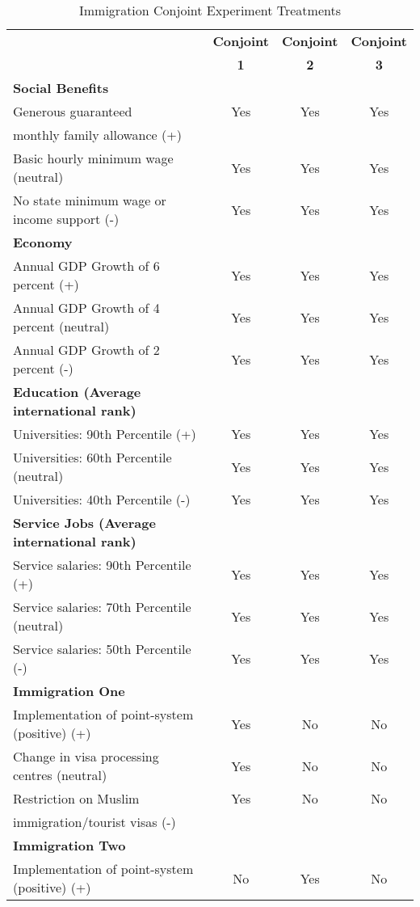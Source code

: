 \documentclass[12pt]{article}
\begin{document}
\begin{table}[!ht]
\caption{Immigration Conjoint Experiment Treatments}\label{tab:attributes}
\begin{center}
\begin{tabular}{lccc}\footnotesize
&\bf Conjoint& \bf Conjoint& \bf Conjoint\\
&\bf  1 & \bf  2 & \bf  3 \\
\hline\hline
\bf Social Benefits &  & & \\
Generous guaranteed& Yes & Yes & Yes \\
monthly family allowance (+)&  &  &  \\
Basic hourly minimum wage (neutral)& Yes & Yes  & Yes \\
No state minimum wage or income support (-)& Yes & Yes & Yes  \\
\hline\hline
\bf Economy  &  & & \\
Annual GDP Growth of 6 percent (+)& Yes & Yes & Yes \\
Annual GDP Growth of 4 percent (neutral)& Yes & Yes  & Yes \\
Annual GDP Growth of 2 percent (-)& Yes & Yes & Yes  \\
\hline\hline
\bf Education (Average international rank)      & & & \\
Universities: 90th Percentile (+)& Yes & Yes & Yes \\
Universities: 60th Percentile (neutral)& Yes & Yes  & Yes \\
Universities: 40th Percentile (-)& Yes & Yes & Yes  \\
\hline\hline
\bf Service Jobs (Average international rank)  & & & \\
Service salaries: 90th Percentile (+)& Yes & Yes & Yes \\
Service salaries: 70th Percentile (neutral)& Yes & Yes  & Yes \\
Service salaries: 50th Percentile (-)& Yes & Yes & Yes  \\
\hline\hline
\bf Immigration One   & & & \\
  Implementation of point-system (positive) (+)& Yes & No & No \\
Change in visa processing centres (neutral)& Yes & No  & No \\
 Restriction on Muslim & Yes & No & No  \\
immigration/tourist visas (-)&  &  &   \\
\hline\hline
\bf Immigration Two   & & & \\
  Implementation of point-system (positive) (+)& No & Yes & No \\

\end{tabular}
\end{center}
\end{table}
\end{document}
